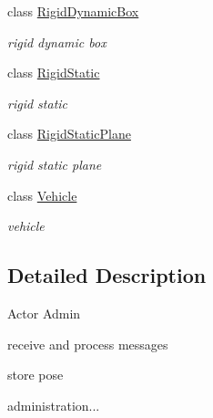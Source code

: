 \begin{DoxyCompactItemize}
class \hyperlink{classContent_1_1Actor_1_1Admin_1_1RigidDynamicBox}{RigidDynamicBox}
\begin{DoxyCompactList}\small\item\em rigid dynamic box \item\end{DoxyCompactList}\item 
class \hyperlink{classContent_1_1Actor_1_1Admin_1_1RigidStatic}{RigidStatic}
\begin{DoxyCompactList}\small\item\em rigid static \item\end{DoxyCompactList}\item 
class \hyperlink{classContent_1_1Actor_1_1Admin_1_1RigidStaticPlane}{RigidStaticPlane}
\begin{DoxyCompactList}\small\item\em rigid static plane \item\end{DoxyCompactList}\item 
class \hyperlink{classContent_1_1Actor_1_1Admin_1_1Vehicle}{Vehicle}
\begin{DoxyCompactList}\small\item\em vehicle \item\end{DoxyCompactList}\end{DoxyCompactItemize}


\subsection{Detailed Description}
Actor Admin 
\begin{DoxyItemize}
\item receive and process messages
\item store pose
\item administration... 
\end{DoxyItemize}